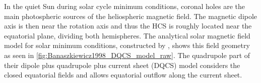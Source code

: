 In the quiet Sun during solar cycle minimum conditions, coronal holes are the main photospheric sources of the heliospheric magnetic field. The magnetic dipole axis is then near the rotation axis and thus the HCS is roughly located near the equatorial plane, dividing both hemispheres. The analytical solar magnetic field model for solar minimum conditions, constructed by \citet{Banaszkiewicz1998}, shows this field geometry as seen in \autoref{fig:Banaszkiewicz1998_DQCS_model_raw}. The quadrupole part of their dipole plus quadrupole plus current sheet (DQCS) model considers the closed equatorial fields and allows equatorial outflow along the current sheet.
\begin{figure}[htb]
	\begin{floatrow}
\end{floatrow}
\end{figure}
